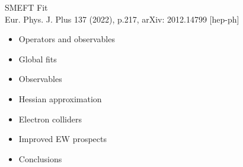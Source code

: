 \documentclass[mathserif, 10pt]{beamer}
\begin{document}
\begin{frame}[plain] %
    \begin{block}{{\Large SMEFT Fit}\\Eur. Phys. J. Plus 137 (2022), p.217, arXiv: 2012.14799 [hep-ph]}
        \begin{itemize}
            \item Operators and observables
            \item Global fits
            \item Observables
            \item Hessian approximation
            \item Electron colliders
            \item Improved EW prospects
            \item Conclusions
        \end{itemize}
    \end{block}

\end{frame}
\end{document}
